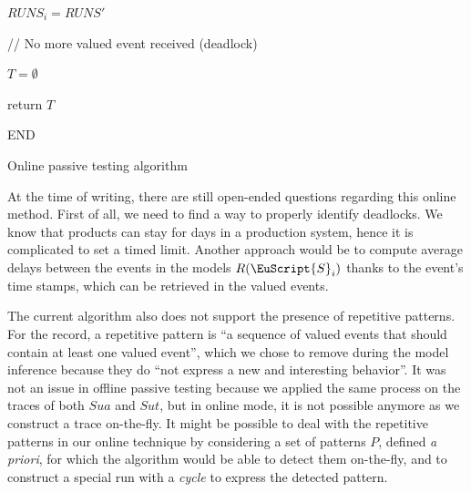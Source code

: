 \begin{algorithm}[h]
{{{{{                        %

                    }%

                }%

            }%

            $RUNS_i = RUNS'$\;\label{algo:check-online:line:runs-i-up}
        }%


    }%

    \BlankLine
    // No more valued event received (deadlock)
    \BlankLine

    $T = \emptyset$\;

    return $T$\;\label{on:l27}

    \BlankLine
    END\;

    \caption{Online passive testing algorithm}
    \label{algo:check-online}
\end{algorithm}

\clearpage

At the time of writing, there are still open-ended questions
regarding this online method. First of all, we need to find a way
to properly identify deadlocks. We know that products can stay
for days in a production system, hence it is complicated to set a
timed limit. Another approach would be to compute average delays
between the events in the models $R(\EuScript{S}_i)$ thanks to
the event's time stamps, which can be retrieved in the valued
events.

The current algorithm also does not support the presence of
repetitive patterns. For the record, a repetitive pattern is
\enquote{a sequence of valued events that should contain at least
one valued event}, which we chose to remove during the model
inference because they do \enquote{not express a new and
interesting behavior}. It was not an issue in offline passive
testing because we applied the same process on the traces of both
$\mathit{Sua}$ and $\mathit{Sut}$, but in online mode, it is not
possible anymore as we construct a trace on-the-fly. It might be
possible to deal with the repetitive patterns in our online
technique by considering a set of patterns $P$, defined \emph{a
priori}, for which the algorithm would be able to detect them
on-the-fly, and to construct a special run with a \emph{cycle} to
express the detected pattern.

